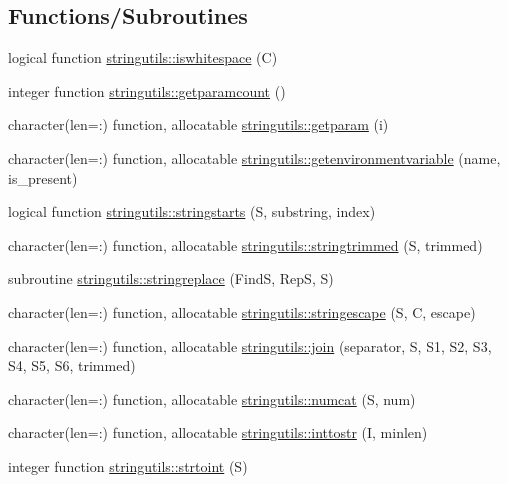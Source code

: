 \subsection*{Functions/\+Subroutines}
\begin{DoxyCompactItemize}
\item 
logical function \mbox{\hyperlink{namespacestringutils_ae4eb174b5b8dcf64a0a61be0519ea343}{stringutils\+::iswhitespace}} (C)
\item 
integer function \mbox{\hyperlink{namespacestringutils_a8837c1b537afbf19f8138389d9cdf434}{stringutils\+::getparamcount}} ()
\item 
character(len=\+:) function, allocatable \mbox{\hyperlink{namespacestringutils_a4553b9553b31c1e21fe6b70b54fde501}{stringutils\+::getparam}} (i)
\item 
character(len=\+:) function, allocatable \mbox{\hyperlink{namespacestringutils_a7869404fd42c1f41212cbd62a5e225f3}{stringutils\+::getenvironmentvariable}} (name, is\+\_\+present)
\item 
logical function \mbox{\hyperlink{namespacestringutils_a83f80ac2eecd8ff5e8fd18faba396ec9}{stringutils\+::stringstarts}} (S, substring, index)
\item 
character(len=\+:) function, allocatable \mbox{\hyperlink{namespacestringutils_ac5e67eb0a4de77625ac1447804e1f934}{stringutils\+::stringtrimmed}} (S, trimmed)
\item 
subroutine \mbox{\hyperlink{namespacestringutils_aaf1a42410d8de4ec72b5f8f00f538f35}{stringutils\+::stringreplace}} (FindS, RepS, S)
\item 
character(len=\+:) function, allocatable \mbox{\hyperlink{namespacestringutils_a077361529d56f5b3f1903f5a145a4745}{stringutils\+::stringescape}} (S, C, escape)
\item 
character(len=\+:) function, allocatable \mbox{\hyperlink{namespacestringutils_a29f32cf04e0c44fc8ee8dfa9819b915d}{stringutils\+::join}} (separator, S, S1, S2, S3, S4, S5, S6, trimmed)
\item 
character(len=\+:) function, allocatable \mbox{\hyperlink{namespacestringutils_af68508e2bb36d836c0f94f476f728cb3}{stringutils\+::numcat}} (S, num)
\item 
character(len=\+:) function, allocatable \mbox{\hyperlink{namespacestringutils_a8308d148fc2d1fd7e23aea926bfd837f}{stringutils\+::inttostr}} (I, minlen)
\item 
integer function \mbox{\hyperlink{namespacestringutils_af51a1a8adbae76da62979f25232bd8df}{stringutils\+::strtoint}} (S)
\item 

\end{DoxyCompactItemize}
